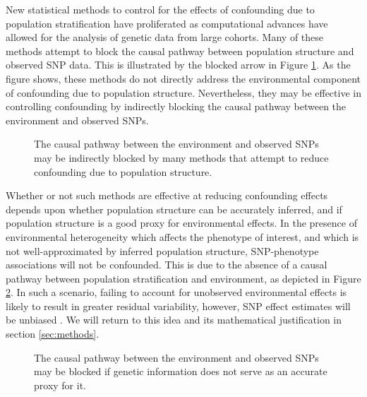 New statistical methods to control for the effects of confounding due to population stratification have proliferated as computational advances have allowed for the analysis of genetic data from large cohorts. Many of these methods attempt to block the causal pathway between population structure and observed SNP data. This is illustrated by the blocked arrow in Figure \ref{fig:ps_env_block}. As the figure shows, these methods do not directly address the environmental component of confounding due to population structure. Nevertheless, they may be effective in controlling confounding by indirectly blocking the causal pathway between the environment and observed SNPs. 

\begin{figure}[H]
\centering
{}
\caption{The causal pathway between the environment and observed SNPs may be indirectly blocked by many methods that attempt to reduce confounding due to population structure.}
\label{fig:ps_env_block}
\end{figure}

Whether or not such methods are effective at reducing confounding effects depends upon whether population structure can be accurately inferred, and if population structure is a good proxy for environmental effects. In the presence of environmental heterogeneity which affects the phenotype of interest, and which is not well-approximated by inferred population structure, SNP-phenotype associations will not be confounded. This is due to the absence of a causal pathway between population stratification and environment, as depicted in Figure \ref{fig:ps_env_block2}. In such a scenario, failing to account for unobserved environmental effects is likely to result in greater residual variability, however, SNP effect estimates will be unbiased \citep{greenland1999causal}. We will return to this idea and its mathematical justification in section \ref{sec:methods}. 

\begin{figure}[H]
\centering
{}
\caption{The causal pathway between the environment and observed SNPs may be blocked if genetic information does not serve as an accurate proxy for it.}
\label{fig:ps_env_block2}
\end{figure}

